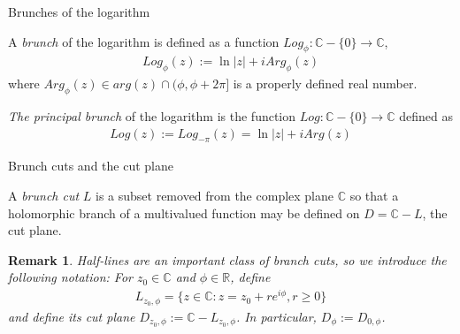 \documentclass{beamer}
\newtheorem{remark}{Remark}
\begin{document}
\begin{frame}{Brunches of the logarithm}



\begin{definition}[1.7.9 on p.17, Gratwick]
	A \emph{brunch} of the logarithm is defined as a function $Log_{\phi}:\mathbb{C}-\{0\}\to\mathbb{C}$,
	\begin{align*}
		Log_{\phi}(z):=\ln |z|+iArg_{\phi}(z)
	\end{align*}
	where $Arg_{\phi}(z)\in arg(z)\cap (\phi,\phi+2\pi]$ is a properly defined real number.
\end{definition}\pause

\begin{example}
	\emph{The principal brunch} of the logarithm is the function $Log:\mathbb{C}-\{0\}\to\mathbb{C}$ defined as 
		\begin{align*}
			Log(z):=Log_{-\pi}(z)=\ln |z|+iArg(z)
		\end{align*}
\end{example}

\end{frame}


\begin{frame}{Brunch cuts and the cut plane}

\begin{definition}[1.7.7 on p.17, Gratwick]
	A \emph{brunch cut} $L$ is a subset removed from the complex plane $\mathbb{C}$ so that a holomorphic branch of a multivalued function may be defined on $D=\mathbb{C}-L$, the cut plane.
\end{definition}\pause


\begin{remark}
	\emph{Half-lines} are an important class of branch cuts, so we introduce the following notation: For $z_0\in\mathbb{C}$ and $\phi\in\mathbb{R}$, define
	\begin{align*}
		L_{z_0,\phi}=\{z\in\mathbb{C}:z=z_0+re^{i\phi},r\geq 0\}
	\end{align*}
	and define its cut plane $D_{z_0,\phi}:=\mathbb{C}-L_{z_0,\phi}$. In particular, $D_\phi:=D_{0,\phi}$.
\end{remark}
\end{frame}
\end{document}
